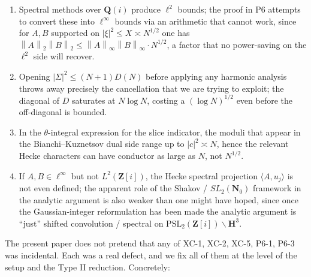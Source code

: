 \documentclass[11pt]{article}
\theoremstyle{definition}
\newcommand{\Nz}{\mathbf{N}_0}
\newcommand{\Z}{\mathbf{Z}}
\newcommand{\Q}{\mathbf{Q}}
\newcommand{\HH}{\mathbf{H}}
\newcommand{\Zi}{\Z[i]}
\newcommand{\Qi}{\Q(i)}
\newcommand{\SLNz}{SL_2(\Nz)}
\newcommand{\norm}[1]{\left\lVert #1\right\rVert}
\begin{document}
\begin{enumerate}
\item[(XC-1, XC-2)] Spectral methods over $\Qi$ produce $\ell^2$ bounds; the proof in P6 attempts to convert these into $\ell^\infty$ bounds via an arithmetic that cannot work, since for $A,B$ supported on $|\xi|^2\le X\asymp N^{1/2}$ one has $\norm{A}_2\norm{B}_2\le\norm{A}_\infty\norm{B}_\infty\cdot N^{1/2}$, a factor that no power-saving on the $\ell^2$ side will recover.
\item[(P6-1)] Opening $|\Sigma|^2\le (N+1)D(N)$ before applying any harmonic analysis throws away precisely the cancellation that we are trying to exploit; the diagonal of $D$ saturates at $N\log N$, costing a $(\log N)^{1/2}$ even before the off-diagonal is bounded.
\item[(XC-5)] In the $\theta$-integral expression for the slice indicator, the moduli that appear in the Bianchi--Kuznetsov dual side range up to $|c|^2\asymp N$, hence the relevant Hecke characters can have conductor as large as $N$, not $N^{1/2}$.
\item[(P6-3, XC-6)] If $A,B\in\ell^\infty$ but not $L^2(\Zi)$, the Hecke spectral projection $\langle A,u_j\rangle$ is not even defined; the apparent role of the Shakov / $\SLNz$ framework in the analytic argument is also weaker than one might have hoped, since once the Gaussian-integer reformulation has been made the analytic argument is ``just'' shifted convolution / spectral on $\mathrm{PSL}_2(\Zi)\backslash\HH^3$.
\end{enumerate}

The present paper does not pretend that any of XC-1, XC-2, XC-5, P6-1, P6-3 was incidental. Each was a real defect, and we fix all of them at the level of the setup and the Type II reduction. Concretely:
\end{document}
